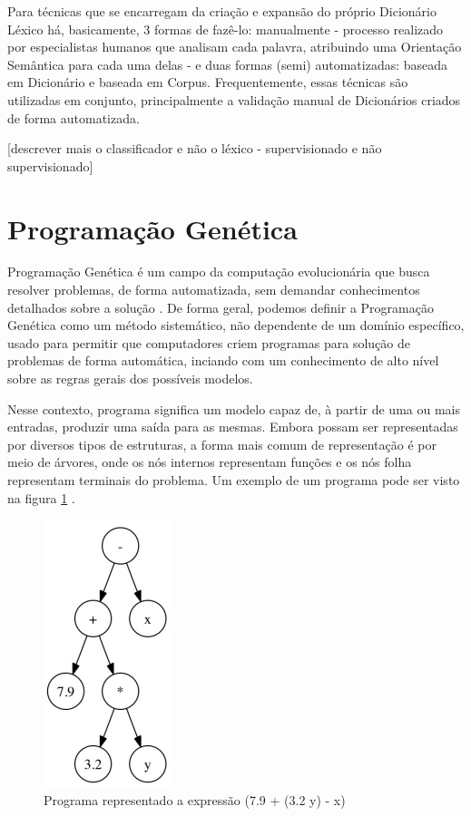 \documentclass[12pt]{article}
\begin{document}
Para técnicas que se encarregam da criação e expansão do próprio Dicionário Léxico há, basicamente, 3 formas de fazê-lo: manualmente -  processo realizado por especialistas humanos que analisam cada palavra, atribuindo uma Orientação Semântica para cada uma delas -  e duas formas (semi) automatizadas: baseada em Dicionário e baseada em Corpus. Frequentemente, essas técnicas são utilizadas em conjunto, principalmente a validação manual de Dicionários criados de forma automatizada.

[descrever mais o classificador e não o léxico - supervisionado e não supervisionado]

\section{Programação Genética}
Programação Genética é um campo da computação evolucionária que busca resolver problemas, de forma automatizada, sem demandar conhecimentos detalhados sobre a solução \cite{koza1992genetic}. De forma geral, podemos definir a Programação Genética como um método sistemático, não dependente de um domínio específico, usado para permitir que computadores criem programas para solução de problemas de forma automática, inciando com um conhecimento de alto nível sobre as regras gerais dos possíveis modelos.

Nesse contexto, programa significa um modelo capaz de, à partir de uma ou mais entradas, produzir uma saída para as mesmas. Embora possam ser representadas por diversos tipos de estruturas, a forma mais comum de representação é por meio de árvores, onde os nós internos representam funções e os nós folha representam terminais do problema. Um exemplo de um programa pode ser visto na figura \ref{treeProgram} \cite{Sannino2015}.

\begin{figure}[!htb]
	\centering
	\includegraphics{programTree2}
	\caption{Programa representado a expressão (7.9 + (3.2 \* y) - x)}
	\label{treeProgram}
\end{figure}
\end{document}
